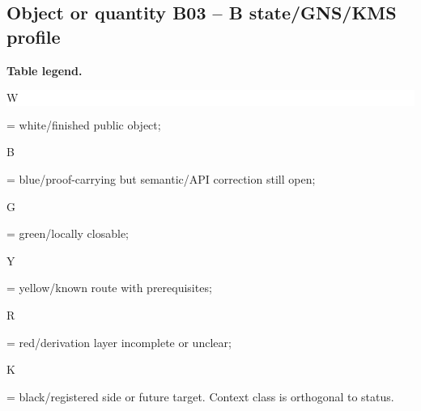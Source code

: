 \subsection*{Object or quantity B03 -- B state/\allowbreak{}GNS/\allowbreak{}KMS profile}
\hypertarget{objproof:B03}{}
\par\smallskip\noindent\begin{minipage}{0.99\linewidth}\footnotesize\raggedright\textbf{Table legend.} \colorbox{white}{\strut W} = white/finished public object; \colorbox{cyan!20}{\strut B} = blue/proof-carrying but semantic/API correction still open; \colorbox{green!18}{\strut G} = green/locally closable; \colorbox{yellow!25}{\strut Y} = yellow/known route with prerequisites; \colorbox{red!20}{\strut R} = red/derivation layer incomplete or unclear; \colorbox{black!18}{\strut K} = black/registered side or future target. Context class is orthogonal to status.\end{minipage}\par\vspace{0.25em}
